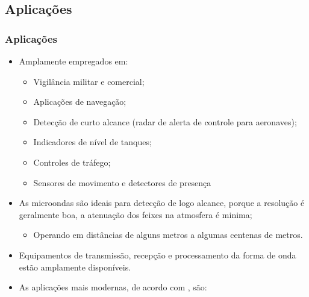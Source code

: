 \documentclass[xcolor=dvipsnames, aspectratio=169]{beamer}
\begin{document}
    \subsection[Aplicações]{Aplicações} 
    \begin{frame}
    \frametitle{Aplicações}
        \begin{itemize}
            \item Amplamente empregados em:
            \begin{itemize}
                \item Vigilância militar e comercial;
                \item Aplicações de navegação;
                \item Detecção de curto alcance (radar de alerta de controle para aeronaves);
                \item Indicadores de nível de tanques;
                \item Controles de tráfego;
                \item Sensores de movimento e detectores de presença
            \end{itemize}
            \item As microondas são ideais para detecção de logo alcance, porque a resolução é geralmente boa, a atenuação dos feixes na atmosfera é minima;
            \begin{itemize}
                \item Operando em distâncias de alguns metros a algumas centenas de
                metros.
            \end{itemize}
            \item Equipamentos de transmissão, recepção e processamento da forma de onda estão amplamente disponíveis.
            \newpage
            \item As aplicações mais modernas, de acordo com \cite{everett1995sensors}, são:
        \end{itemize}
    \end{frame}
\end{document}
